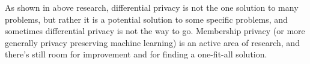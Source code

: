 As shown in above research, differential privacy is not the one solution to many problems, but rather it is a potential solution to some specific problems, and sometimes differential privacy is not the way to go. Membership privacy (or more generally privacy preserving machine learning) is an active area of research, and there's still room for improvement and for finding a one-fit-all solution. 